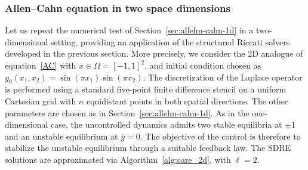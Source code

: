 \documentclass[a4paper,10pt]{article}
\newcommand{\upd}[1]{{\color{black}#1}} %
\begin{document}
\upd{
\subsubsection{Allen--Cahn equation in two space dimensions}
Let us repeat the numerical test of Section~\ref{sec:allehn-cahn-1d} in a two-dimensional setting, providing an application of the structured Riccati solvers developed in the previous section.
More precisely, we consider the 2D analogue of equation~\eqref{AC} with $x\in \Omega = [-1,1]^2$, and initial condition chosen as $
y_0(x_1,x_2) = \sin(\pi x_1)\sin(\pi x_2)
$. The discretization of the Laplace operator is performed using a standard five-point finite difference stencil on a uniform Cartesian grid with $n$ equidistant points in both spatial directions. The other parameters are chosen as in Section~\ref{sec:allehn-cahn-1d}. As in the one-dimensional case, the uncontrolled dynamics admits two stable equilibria at $\pm 1$ and an unstable equilibrium at $\overline y = 0$. The objective of the control is therefore to stabilize the unstable equilibrium through a suitable feedback law. The SDRE solutions are approximated via Algorithm~\ref{alg:care_2d}, with $\ell=2$.

}
\end{document}
